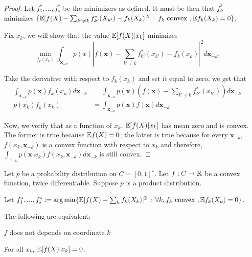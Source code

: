 \documentclass{article}
\begin{document}
 \begin{proof}
 
Let $f^*_1,...,f^*_s$ be the minimizers as defined. It must be then that $f^*_k$ minimizes $\{ \mathbb{E} | f(X) - \sum_{k' \neq k} f^*_{k'} (X_{k'}) - f_k (X_k)|^2 \,:\, f_k \textrm{ convex }, \mathbb{E} f_k(X_k) = 0 \}$.

Fix $x_k$, we will show that the value $\mathbb{E}[ f(X) | x_k]$ minimizes 
\[
\min_{ f_k(x_k) } \int_{\mathbf{x}_{-k}} p(x) | f(\mathbf{x}) - \sum_{k' \neq k} f^*_{k'} (x_{k'}) - f_k (x_k)|^2 d \mathbf{x}_{-k}.
\]

Take the derivative with respect to $f_k(x_k)$ and set it equal to zero, we get that
\begin{align*}
\int_{\mathbf{x}_{-k}} p(\mathbf{x}) f_k(x_k) d \mathbf{x}_{-k} &= \int_{\mathbf{x}_{-k}} p(\mathbf{x}) ( f(\mathbf{x}) - \sum_{k' \neq k} f^*_{k'} (x_{k'}) ) d \mathbf{x}_{-k}  \\
p(x_k) f_k(x_k) &= \int_{\mathbf{x}_{-k}} p(\mathbf{x}) f(\mathbf{x}) d \mathbf{x}_{-k} 
 \end{align*}

Now, we verify that as a function of $x_k$, $\mathbb{E}[ f(X) | x_k]$ has mean zero and is convex. The former is true because $\mathbb{E} f(X) = 0$; the latter is true because for every $\mathbf{x}_{-k}$, $f(x_k, \mathbf{x}_{-k})$ is a convex function with respect to $x_k$ and therefore, $\int_{x_{-k}} p(\mathbf{x}|x_k) f(x_k, \mathbf{x}_{-k}) d \mathbf{x}_{-k}$ is still convex. 
 
 \end{proof}
 
 
 \begin{proposition}
Let $p$ be a probability distribution on $C=[0,1]^s$. Let $f: C \rightarrow \mathbb{R}$ be a convex function, twice differentiable. Suppose $p$ is a product distribution.

Let $f^*_1,...,f^*_s \coloneqq \arg\min \{ \mathbb{E} | f(X) - \sum_k f_k(X_k) |^2 \,:\, \forall k, f_k \textrm{ convex }, \mathbb{E} f_k(X_k) = 0\}$.

The following are equivalent:
\begin{packed_enum}
\item $f$ does not depends on coordinate $k$
\item For all $x_k$, $\mathbb{E}[ f(X) | x_k] = 0$.
\end{packed_enum}
\end{proposition}
\end{document}
